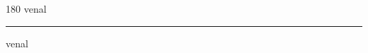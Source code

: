 
\begin{frame}
\begin{center}
\begin{turn}{180}
{\fontsize{2.5cm}{1em}\selectfont venal}
\end{turn}
\vspace{1em}\par  
\hrule
\vspace{1em}\par  
{\fontsize{2.5cm}{1em}\selectfont venal}
\end{center}
\end{frame}

